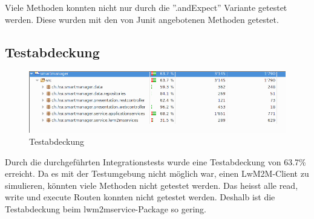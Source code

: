 Viele Methoden konnten nicht nur durch die ''.andExpect'' Variante getestet werden. Diese wurden mit den von Junit angebotenen Methoden getestet.
\subsection{Testabdeckung}
\begin{figure}[H]
\centering
\includegraphics[scale=0.5]{../04_Realisierung/images/testcoverage.png}
\caption{Testabdeckung}
\end{figure}

Durch die durchgeführten Integrationstests wurde eine Testabdeckung von 63.7\% erreicht. Da es mit der Testumgebung nicht möglich war, einen LwM2M-Client zu simulieren, könnten viele Methoden nicht getestet werden. Das heisst alle read, write und execute Routen konnten nicht getestet werden. Deshalb ist die Testabdeckung beim lwm2mservice-Package so gering.